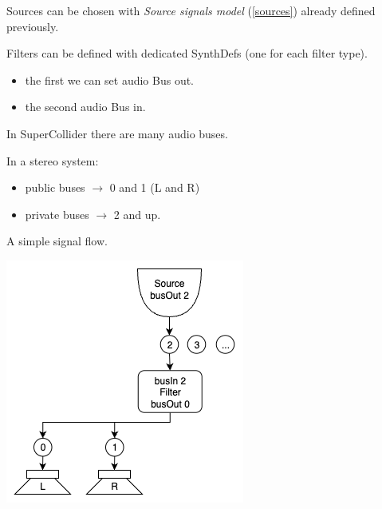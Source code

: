 Sources can be chosen with \textit{Source signals model} (\ref{sources}) already defined previously.

Filters can be defined with dedicated SynthDefs (one for each filter type).

\begin{itemize}
\tightlist 
\item the first we can set audio Bus out.
\item the second audio Bus in.
\end{itemize}

In SuperCollider there are many audio buses.

In a stereo system: 

\begin{itemize}
\tightlist 
\item public buses \(\rightarrow\) 0 and 1 (L and R) 
\item private buses \(\rightarrow\) 2 and up.
\end{itemize}

A simple signal flow.

\begin{center}
\includegraphics[scale=0.75]{../img/filt_1.png}
\end{center}

